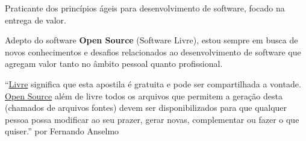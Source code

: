 Praticante dos princípios ágeis para desenvolvimento de software, focado na entrega de valor.

Adepto do software \textbf{Open Source} (Software Livre), estou sempre em busca de novos conhecimentos e desafios relacionados ao desenvolvimento de software que agregam valor tanto no âmbito pessoal quanto profissional. 

\begin{center}
``\underline{Livre} significa que esta apostila é gratuita e pode ser compartilhada a vontade. \underline{Open Source} além de livre todos os arquivos que permitem a geração desta (chamados de arquivos fontes) devem ser disponibilizados para que qualquer pessoa possa modificar ao seu prazer, gerar novas, complementar ou fazer o que quiser.''
por Fernando Anselmo\cite{fernandoanselmo}
\end{center}